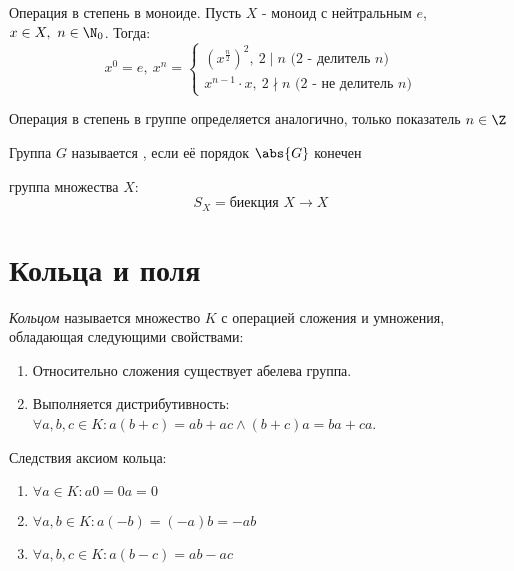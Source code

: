 \documentclass[a4paper, 14pt]{article}
\begin{document}
    \begin{definition}
        Операция { в степень в моноиде.} Пусть $X$ - моноид с нейтральным $e$, $x \in X, \ n \in \N_0$. Тогда:
        \[x^0 = e, \ x^n = 
        \begin{cases}
            \left(x^{\frac{n}{2}}\right)^2, \ 2 \mid n \text{ ($2$ - делитель $n$)}\\
            x^{n-1} \cdot x, \ 2 \nmid n \text{ ($2$ -  не делитель $n$)}
        \end{cases}\]
    \end{definition}
    
    \begin{definition}
        Операция { в степень в группе} определяется аналогично, только показатель $n \in \Z$
    \end{definition}
    
    \begin{definition}
        Группа $G$ называется {}, если её порядок $\abs{G}$ конечен
    \end{definition}
    
    \begin{definition}
        { группа} множества $X$: \[S_X = \text{биекция }X \rightarrow X \]
    \end{definition}
    
    \section{Кольца и поля}

    \begin{definition}
        {\it Кольцом} называется множество $K$ с операцией сложения и умножения, обладающая
        следующими свойствами:
        \begin{enumerate}
            \item Относительно сложения существует абелева группа.
            \item Выполняется дистрибутивность: $\forall a, b, c \in K : a(b + c) = ab + ac \land (b+c)a = ba + ca$.   
        \end{enumerate}
    \end{definition}

    Следствия аксиом кольца:
    \begin{enumerate}
        \item $\forall a \in K : a0 = 0a = 0$
        \item $\forall a, b \in K : a(-b) = (-a)b = -ab$
        \item $\forall a, b, c \in K : a(b-c) = ab - ac$
    \end{enumerate}
\end{document}
